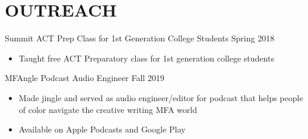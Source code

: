  \section{OUTREACH}
Summit ACT Prep Class for 1st Generation College Students \hfill Spring 2018\\
\begin{itemize}
\item Taught free ACT Preparatory class for 1st generation college students 
\end{itemize}

MFAngle Podcast Audio Engineer \hfill Fall 2019 \\
\begin{itemize}
\item Made jingle and served as audio engineer/editor for podcast that helps people of color navigate the creative writing MFA world
\item Available on Apple Podcasts and Google Play
\end{itemize}